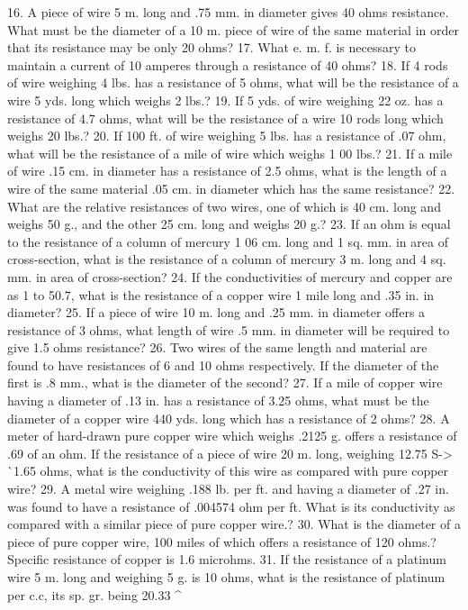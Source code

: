 16. A piece of wire 5 m. long and .75 mm. in diameter gives 40 ohms resistance. What must be the diameter of a 10 m. piece of wire of the same material in order that its resistance may be only 20 ohms?
17. What e. m. f. is necessary to maintain a current of 10 amperes through a resistance of 40 ohms?
18. If 4 rods of wire weighing 4 lbs. has a resistance of 5 ohms, what will be the resistance of a wire 5 yds. long which weighs 2 lbs.?
19. If 5 yds. of wire weighing 22 oz. has a resistance of 4.7 ohms, what will be the resistance of a wire 10 rods long which weighs 20 lbs.?
20. If 100 ft. of wire weighing 5 lbs. has a resistance of .07 ohm, what will be the resistance of a mile of wire which weighs 1 00 lbs.?
21. If a mile of wire .15 cm. in diameter has a resistance of 2.5 ohms, what is the length of a wire of the same material .05 cm. in diameter which has the same resistance?
22. What are the relative resistances of two wires, one of which is 40 cm. long and weighs 50 g., and the other 25 cm. long and weighs 20 g.?
23. If an ohm is equal to the resistance of a column of mercury 1 06 cm. long and 1 sq. mm. in area of cross-section, what is the resistance of a column of mercury 3 m. long and 4 sq. mm. in area of cross-section?
24. If the conductivities of mercury and copper are as 1 to 50.7, what is the resistance of a copper wire 1 mile long and .35 in. in diameter?
25. If a piece of wire 10 m. long and .25 mm. in diameter offers a resistance of 3 ohms, what length of wire .5 mm. in diameter will be required to give 1.5 ohms resistance?
26. Two wires of the same length and material are found to have resistances of 6 and 10 ohms respectively. If the diameter of the first is .8 mm., what is the diameter of the second?
27. If a mile of copper wire having a diameter of .13 in. has a resistance of 3.25 ohms, what must be the diameter of a copper wire 440 yds. long which has a resistance of 2 ohms?
28. A meter of hard-drawn pure copper wire which weighs .2125 g. offers a resistance of .69 of an ohm. If the resistance of a piece of wire 20 m. long, weighing 12.75 S-> ^^ 1.65 ohms, what is the conductivity of this wire as compared with pure copper wire?
29. A metal wire weighing .188 lb. per ft. and having a diameter of .27 in. was found to have a resistance of .004574 ohm per ft. What is its conductivity as compared with a similar piece of pure copper wire.?
30. What is the diameter of a piece of pure copper wire, 100 miles of which offers a resistance of 120 ohms.? Specific resistance of copper is 1.6 microhms.
31. If the resistance of a platinum wire 5 m. long and weighing 5 g. is 10 ohms, what is the resistance of platinum per c.c, its sp. gr. being 20.33 ^
